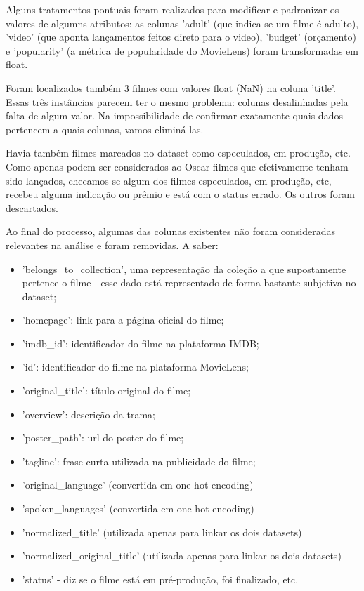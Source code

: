             Alguns tratamentos pontuais foram realizados para modificar e padronizar os valores de algumns atributos: as colunas 'adult' (que indica se um filme é adulto), 'video' (que aponta lançamentos feitos direto para o video), 'budget' (orçamento) e 'popularity' (a métrica de popularidade do MovieLens) foram transformadas em float.
            
            Foram localizados também 3 filmes com valores float (NaN) na coluna 'title'. Essas três instâncias parecem ter o mesmo problema: colunas desalinhadas pela falta de algum valor. Na impossibilidade de confirmar exatamente quais dados pertencem a quais colunas, vamos eliminá-las.
            
            Havia também filmes marcados no dataset como especulados, em produção, etc. Como apenas podem ser considerados ao Oscar filmes que efetivamente tenham sido lançados, checamos se algum dos filmes especulados, em produção, etc, recebeu alguma indicação ou prêmio e está com o status errado. Os outros foram descartados.
            
            Ao final do processo, algumas das colunas existentes não foram consideradas relevantes na análise e foram removidas. A saber:

            \begin{itemize}
                \item 'belongs\_to\_collection', uma representação da coleção a que supostamente pertence o filme - esse dado está representado de forma bastante subjetiva no dataset;
                \item 'homepage': link para a página oficial do filme;
                \item 'imdb\_id': identificador do filme na plataforma IMDB;
                \item 'id': identificador do filme na plataforma MovieLens;
                \item 'original\_title': título original do filme;
                \item 'overview': descrição da trama;
                \item 'poster\_path': url do poster do filme;
                \item 'tagline': frase curta utilizada na publicidade do filme;
                \item 'original\_language' (convertida em one-hot encoding)
                \item 'spoken\_languages' (convertida em one-hot encoding)
                \item 'normalized\_title' (utilizada apenas para linkar os dois datasets)
                \item 'normalized\_original\_title' (utilizada apenas para linkar os dois datasets)
                \item 'status' - diz se o filme está em pré-produção, foi finalizado, etc.
            \end{itemize}

